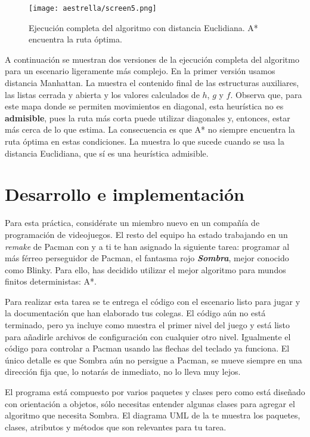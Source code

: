 \begin{figure}[h!]
  \centering
  \texttt{[image: aestrella/screen5.png]}
  \caption{Ejecución completa del algoritmo con distancia Euclidiana.  A* encuentra la ruta óptima.}
  \label{fig:fig4P4}
\end{figure}


A continuación se muestran dos versiones de la ejecución completa del algoritmo para un escenario ligeramente más complejo.  En la primer versión usamos distancia Manhattan.  La  muestra el contenido final de las estructuras auxiliares, las listas cerrada y abierta y los valores calculados de $h$, $g$ y $f$.  Observa que, para este mapa donde se permiten movimientos en diagonal, esta heurística no es \textbf{admisible}, pues la ruta más corta puede utilizar diagonales y, entonces, estar más cerca de lo que estima.  La consecuencia es que A* no siempre encuentra la ruta óptima en estas condiciones.  La  muestra lo que sucede cuando se usa la distancia Euclidiana, que sí es una heurística admisible.


\section{Desarrollo e implementaci\'on}

Para esta práctica, considérate un miembro nuevo en un compañía de programación de videojuegos.  El resto del equipo ha estado trabajando en un \textit{remake} de Pacman con  y a ti te han asignado la siguiente tarea: programar al más férreo perseguidor de Pacman, el fantasma rojo \textbf{\textit{Sombra}}, mejor conocido como Blinky. Para ello, has decidido utilizar el mejor algoritmo para mundos finitos deterministas: A*.

Para realizar esta tarea se te entrega el código con el escenario listo para jugar y la documentación que han elaborado tus colegas.  El código aún no está terminado, pero ya incluye como muestra el primer nivel del juego y está listo para añadirle archivos de configuración con cualquier otro nivel.  Igualmente el código para controlar a Pacman usando las flechas del teclado ya funciona.  El único detalle es que Sombra aún no persigue a Pacman, se mueve siempre en una dirección fija que, lo notarás de inmediato, no lo lleva muy lejos.

El programa está compuesto por varios paquetes y clases pero como está diseñado con orientación a objetos, sólo necesitas entender algunas clases para agregar el algoritmo que necesita Sombra.  El diagrama UML de la  te muestra los paquetes, clases, atributos y métodos que son relevantes para tu tarea.

